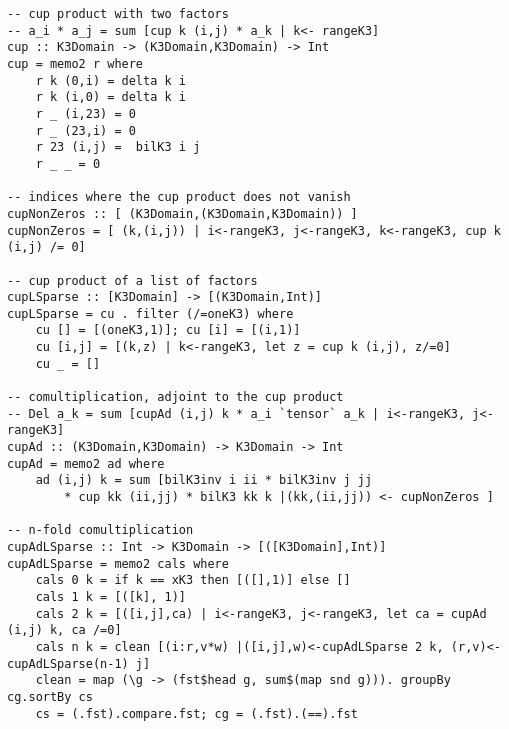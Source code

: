 \begin{lstlisting}
-- cup product with two factors
-- a_i * a_j = sum [cup k (i,j) * a_k | k<- rangeK3]
cup :: K3Domain -> (K3Domain,K3Domain) -> Int
cup = memo2 r where
	r k (0,i) = delta k i
	r k (i,0) = delta k i
	r _ (i,23) = 0
	r _ (23,i) = 0
	r 23 (i,j) =  bilK3 i j
	r _ _ = 0

-- indices where the cup product does not vanish
cupNonZeros :: [ (K3Domain,(K3Domain,K3Domain)) ]
cupNonZeros = [ (k,(i,j)) | i<-rangeK3, j<-rangeK3, k<-rangeK3, cup k (i,j) /= 0]

-- cup product of a list of factors
cupLSparse :: [K3Domain] -> [(K3Domain,Int)]
cupLSparse = cu . filter (/=oneK3) where
	cu [] = [(oneK3,1)]; cu [i] = [(i,1)]
	cu [i,j] = [(k,z) | k<-rangeK3, let z = cup k (i,j), z/=0]
	cu _ = []

-- comultiplication, adjoint to the cup product
-- Del a_k = sum [cupAd (i,j) k * a_i `tensor` a_k | i<-rangeK3, j<-rangeK3]
cupAd :: (K3Domain,K3Domain) -> K3Domain -> Int
cupAd = memo2 ad where 
	ad (i,j) k = sum [bilK3inv i ii * bilK3inv j jj 
		* cup kk (ii,jj) * bilK3 kk k |(kk,(ii,jj)) <- cupNonZeros ]

-- n-fold comultiplication
cupAdLSparse :: Int -> K3Domain -> [([K3Domain],Int)]
cupAdLSparse = memo2 cals where
	cals 0 k = if k == xK3 then [([],1)] else []
	cals 1 k = [([k], 1)]
	cals 2 k = [([i,j],ca) | i<-rangeK3, j<-rangeK3, let ca = cupAd (i,j) k, ca /=0]
	cals n k = clean [(i:r,v*w) |([i,j],w)<-cupAdLSparse 2 k, (r,v)<-cupAdLSparse(n-1) j]
	clean = map (\g -> (fst$head g, sum$(map snd g))). groupBy cg.sortBy cs  
	cs = (.fst).compare.fst; cg = (.fst).(==).fst

\end{lstlisting}

